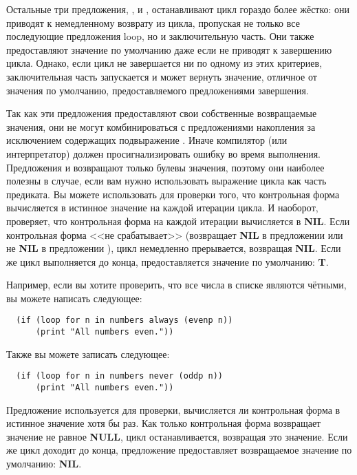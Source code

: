 Остальные три предложения, ,  и , останавливают
цикл гораздо более жёстко: они приводят к немедленному возврату из цикла, пропуская не
только все последующие предложения loop, но и заключительную часть. Они также
предоставляют значение по умолчанию даже если не приводят к завершению цикла. Однако, если
цикл не завершается ни по одному из этих критериев, заключительная часть запускается и
может вернуть значение, отличное от значения по умолчанию, предоставляемого предложениями
завершения.

Так как эти предложения предоставляют свои собственные возвращаемые значения, они не могут
комбинироваться с предложениями накопления за исключением содержащих подвыражение
. Иначе компилятор (или интерпретатор) должен просигнализировать ошибку во
время выполнения. Предложения  и  возвращают только булевы
значения, поэтому они наиболее полезны в случае, если вам нужно использовать выражение
цикла как часть предиката. Вы можете использовать  для проверки того, что
контрольная форма вычисляется в истинное значение на каждой итерации цикла. И наоборот,
 проверяет, что контрольная форма на каждой итерации вычисляется в
\textbf{NIL}. Если контрольная форма <<не срабатывает>> (возвращает \textbf{NIL} в
предложении  или не \textbf{NIL} в предложении ), цикл немедленно
прерывается, возвращая \textbf{NIL}. Если же цикл выполняется до конца, предоставляется
значение по умолчанию: \textbf{T}.

Например, если вы хотите проверить, что все числа в списке  являются
чётными, вы можете написать следующее:

\begin{lstlisting}
  (if (loop for n in numbers always (evenp n))
      (print "All numbers even."))
\end{lstlisting}

Также вы можете записать следующее:

\begin{lstlisting}
  (if (loop for n in numbers never (oddp n))
      (print "All numbers even."))
\end{lstlisting}

Предложение  используется для проверки, вычисляется ли контрольная форма в
истинное значение хотя бы раз. Как только контрольная форма возвращает значение не равное
\textbf{NULL}, цикл останавливается, возвращая это значение. Если же цикл доходит до
конца, предложение  предоставляет возвращаемое значение по умолчанию:
\textbf{NIL}.

